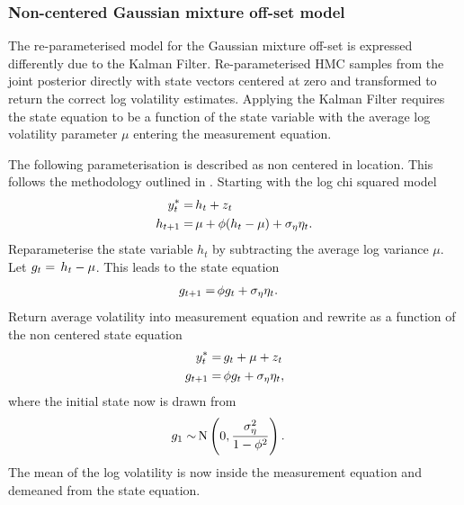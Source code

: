 \documentclass[12pt, a4paper]{article}
\begin{document}
        \subsubsection{Non-centered Gaussian mixture off-set model}
        The re-parameterised model for the Gaussian mixture off-set is expressed differently due to the Kalman Filter. Re-parameterised HMC samples from the joint posterior directly with state vectors centered at zero and transformed to return the correct log volatility estimates. Applying the Kalman Filter requires the state equation to be a function of the state variable with the average log volatility parameter $\mu$ entering the measurement equation.

        The following parameterisation is described as non centered in location. This follows the methodology outlined in \citet{strickland2008parameterisation}. Starting with the log chi squared model
        \begin{align}
        y^{\ast}_t =& \space \, h_t + z_t \\
        h_{t+1} =& \space \, \mu +\phi(h_t - \mu) + \sigma_{\eta} \eta_t.
        \end{align}
        Reparameterise the state variable $h_t$ by subtracting the average log variance $\mu$. Let $g_t = \space \, h_t - \mu$. This leads to the state equation
        \begin{align}
        g_{t+1} =& \space \, \phi g_t + \sigma_{\eta}\eta_{t}.
        \end{align}
        Return average volatility into measurement equation and rewrite as a function of the non centered state equation
        \begin{align}
        y^{\ast}_t =& \space \, g_t + \mu + z_t \\
        g_{t+1} =& \space \, \phi g_t + \sigma_{\eta}\eta_{t},
        \end{align}
        where the initial state now is drawn from 
        \begin{align}
            g_1 \sim& \space \,\mathrm{N}\left(0, \frac{\sigma_{\eta}^2}{1-\phi^2}\right).
        \end{align}
        The mean of the log volatility is now inside the measurement equation and demeaned from the state equation.
    
\end{document}
